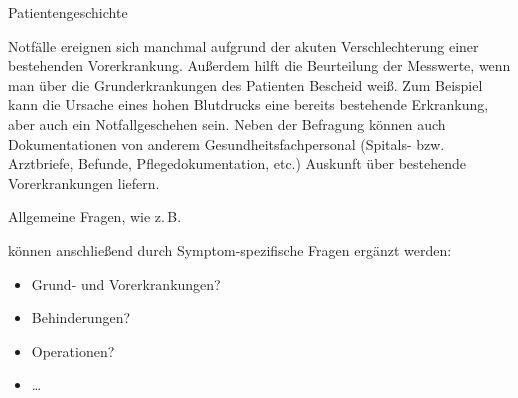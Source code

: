 \TextSlide
{ Patientengeschichte}
{Notfälle ereignen sich manchmal aufgrund der akuten
Verschlechterung einer bestehenden Vorerkrankung. Außerdem
hilft die Beurteilung der Messwerte, wenn man über die
Grunderkrankungen des Patienten Bescheid weiß. Zum Beispiel
kann die Ursache eines hohen Blutdrucks eine bereits
bestehende Erkrankung, aber auch ein Notfallgeschehen sein.
Neben der Befragung können auch Dokumentationen von anderem
Gesundheitsfachpersonal (Spitals- bzw. Arztbriefe, Befunde,
Pflegedokumentation, etc.) Auskunft über bestehende
Vorerkrankungen liefern.


Allgemeine Fragen,
wie z.\,B.
\begin{quote}
    
\end{quote}
können anschließend durch Symptom-spezifische Fragen ergänzt
werden:
\begin{quote}
    
    
\end{quote}}
{
\begin{itemize}
  \item Grund- und Vorerkrankungen?
  \item Behinderungen?
  \item Operationen?
  \item \ldots
\end{itemize}
}
{}
{}
{}


